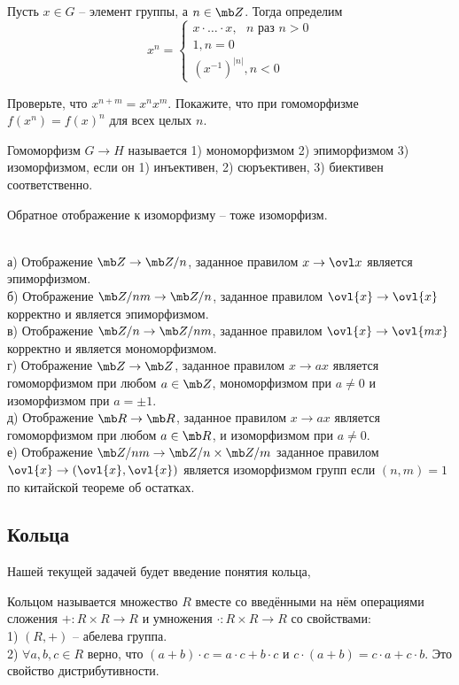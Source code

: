 \dfn Пусть $x \in G$ -- элемент группы, а $n\in \mb Z$. Тогда определим $$x^n=\begin{cases}
x\cdot \dots \cdot x, \text{ $n$ раз } n>0\\
1, n=0\\
(x^{-1})^{|n|}, n<0
\end{cases}$$
\edfn

\upr Проверьте, что $x^{n+m}=x^nx^m$. Покажите, что при гомоморфизме $f(x^n)=f(x)^n$ для всех целых $n$.
\eupr

\dfn[Изоморфизм] Гомоморфизм $G\to H$ называется 1) мономорфизмом 2) эпиморфизмом 3) изоморфизмом, если он 1) инъективен, 2) сюръективен, 3) биективен соответственно.
\edfn

\rm Обратное отображение к изоморфизму -- тоже изоморфизм.
\erm

\exm\\
а) Отображение $\mb Z \to\mb Z/n$, заданное правилом $x\to \ovl x$ является эпиморфизмом.\\
б) Отображение $\mb Z/nm \to \mb Z/n$, заданное правилом $\ovl{x} \to \ovl{x}$ корректно и является эпиморфизмом.\\
в) Отображение $\mb Z/n \to \mb Z/nm$, заданное правилом $\ovl{x}\to \ovl{mx}$ корректно и является мономорфизмом.\\
г)  Отображение $\mb Z \to \mb Z$, заданное правилом $x \to ax$ является гомоморфизмом при любом $a\in \mb Z$, мономорфизмом при $a\neq 0$ и изоморфизмом при $a=\pm 1$.\\
д)  Отображение $\mb R \to \mb R$, заданное правилом $x \to ax$ является гомоморфизмом при любом $a\in \mb R$,  и изоморфизмом при $a\neq 0$.\\
е) Отображение $\mb Z/nm \to\mb Z/n\times \mb Z/m$ заданное правилом $\ovl{x}\to (\ovl{x},\ovl{x})$ является изоморфизмом групп если $(n,m)=1$ по китайской теореме об остатках.\\





\subsection{Кольца}

Нашей текущей задачей будет введение понятия кольца, 

\dfn[Кольцо] Кольцом называется множество $R$ вместе со введёнными на нём операциями сложения $+\colon R\times R \to R$ и умножения $\cdot \colon R \times R \to R$ со свойствами:\\
1) $(R,+)$ – абелева группа.\\
2) $\forall a,b,c \in R$ верно, что $(a+b)\cdot c= a\cdot c+ b\cdot c$ и  $c\cdot (a+b)= c\cdot a+ c\cdot b$. Это свойство дистрибутивности.
\edfn

